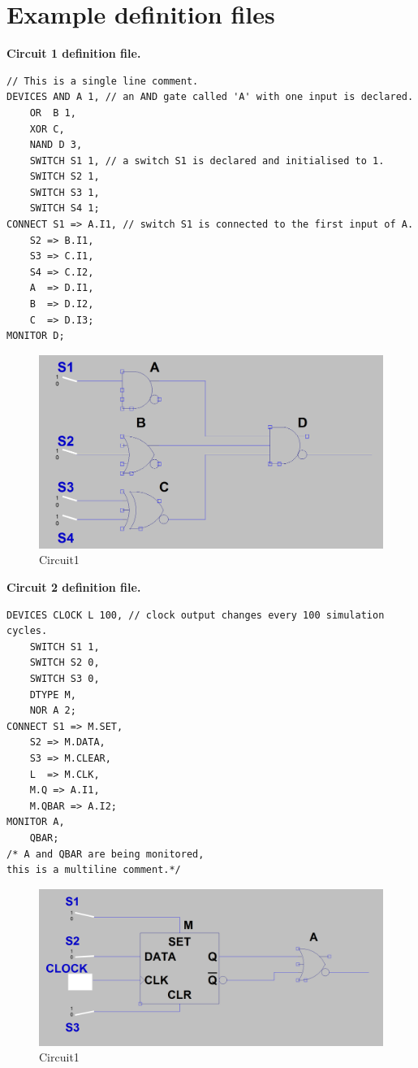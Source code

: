\documentclass[12pt]{article}
\def\n{\noindent}
\begin{document}
\section{Example definition files}
\textbf{Circuit 1 definition file.}\\
\begin{lstlisting}[basicstyle=\small]
// This is a single line comment.
DEVICES AND A 1, // an AND gate called 'A' with one input is declared.
	OR  B 1,
	XOR C,
	NAND D 3,
	SWITCH S1 1, // a switch S1 is declared and initialised to 1.
	SWITCH S2 1,
	SWITCH S3 1,
	SWITCH S4 1;
CONNECT S1 => A.I1, // switch S1 is connected to the first input of A.
	S2 => B.I1,
	S3 => C.I1,
	S4 => C.I2,
	A  => D.I1,
	B  => D.I2,
	C  => D.I3;
MONITOR D;
\end{lstlisting}
\begin{figure}[H]
  \centering
  \includegraphics[width=0.8\linewidth]{circuit1.png}
  \caption{Circuit1}
  \label{fig:1}
\end{figure}

\newpage
\n\textbf{Circuit 2 definition file.}
\begin{lstlisting}[basicstyle=\small]
DEVICES CLOCK L 100, // clock output changes every 100 simulation cycles.
	SWITCH S1 1,
	SWITCH S2 0,
	SWITCH S3 0,
	DTYPE M,
	NOR A 2;
CONNECT S1 => M.SET,
	S2 => M.DATA,
	S3 => M.CLEAR,
	L  => M.CLK,
	M.Q => A.I1,
	M.QBAR => A.I2;
MONITOR A,
	QBAR;
/* A and QBAR are being monitored,
this is a multiline comment.*/
\end{lstlisting}
\begin{figure}[H]
  \centering
  \includegraphics[width=0.8\linewidth]{circuit2.png}
  \caption{Circuit1}
  \label{fig:2}
\end{figure}
\end{document}
